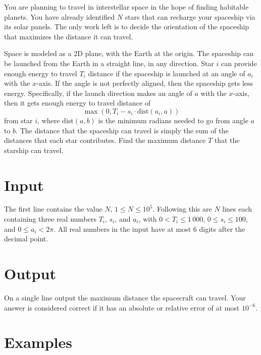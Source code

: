

\noindent
You are planning to travel in interstellar space in the hope of finding habitable
planets. You have already identified $N$ stars that
can recharge your spaceship via its solar panels. The only work left
is to decide the orientation of the spaceship that maximizes the
distance it can travel.

Space is modeled as a 2D plane, with the Earth at the origin.
The spaceship can be launched from the Earth in a straight line,
in any direction. Star $i$ can provide enough energy to travel $T_i$
distance if the spaceship is launched at an angle of $a_i$ with the
$x$-axis. If the angle is not perfectly aligned, then the spaceship
gets less energy. Specifically, if the launch direction makes
an angle of $a$ with the $x$-axis, then it gets enough energy to travel
distance of \[\max(0, T_i - s_i \cdot \mathrm{dist}(a_i, a))\] from star $i$, where
$\mathrm{dist}(a,b)$ is the minimum radians needed to go from angle $a$ to $b$. The
distance that the spaceship can travel is simply the sum of the
distances that each star contributes. Find the maximum distance $T$
that the starship can travel.

\section*{Input}

The first line contains the value $N$, $1\le N\le 10^5$.  Following
this are $N$ lines each containing three real numbers
$T_i$, $s_i$, and $a_i$, with $0<T_i\le 1\,000$, $0\le s_i\le 100$, and
$0\le a_i < 2\pi$. All real numbers in the input have at most $6$ digits after
the decimal point.

\section*{Output}

On a single line output the maximum distance the spacecraft can
travel. Your answer is considered correct if it has an absolute or relative
error of at most $10^{-6}$.

\section*{Examples}
